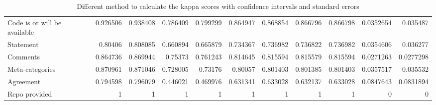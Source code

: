 \documentclass{article}
\begin{document}
\begin{table}[H]
\begin{tabular}{lrrrrrrrrrr}
 Code is or will be available           &                   0.926506 &               0.938408 &                  0.786409 &              0.799299 &                       0.864947 &                   0.868854 &                    0.866796 &                     0.866798 &             0.0352654 &         0.035487  \\
 Statement                              &                   0.80406  &               0.808085 &                  0.660894 &              0.665879 &                       0.734367 &                   0.736982 &                    0.736822 &                     0.736982 &             0.0354606 &         0.036277  \\
 Comments                               &                   0.864736 &               0.869944 &                  0.75373  &              0.761243 &                       0.814645 &                   0.815594 &                    0.815579 &                     0.815594 &             0.0271263 &         0.0277298 \\
 Meta-categories                        &                   0.870961 &               0.871046 &                  0.728005 &              0.73176  &                       0.80057  &                   0.801403 &                    0.801385 &                     0.801403 &             0.0357517 &         0.035532  \\
 Agreement                              &                   0.794598 &               0.796079 &                  0.446021 &              0.469976 &                       0.631341 &                   0.633028 &                    0.632137 &                     0.633028 &             0.0847643 &         0.0831894 \\
 Repo provided                          &                   1        &               1        &                  1        &              1        &                       1        &                   1        &                    1        &                     1        &             0         &         0         \\
\hline
\end{tabular}\caption{Different method to calculate the kappa scores with confidence intervals and standard errors}

\end{table}
\end{document}
